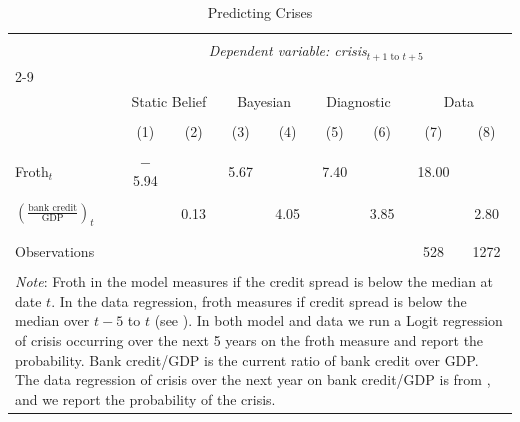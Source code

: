 
\begin{table}[!htbp] \centering 
  \caption{Predicting Crises} 
  \label{prediction of crises} 
\begin{tabular}{@{\extracolsep{10pt}}lcccccccc} 
\\[-1.8ex]\hline 
\hline \\[-1.8ex] 
 & \multicolumn{8}{c}{\textit{Dependent variable: crisis$_{t+1\text{ to }t+5}$}} \\ 
\cline{2-9} 
\\[-1.8ex]
 & \multicolumn{2}{c}{Static Belief} & \multicolumn{2}{c}{Bayesian} & \multicolumn{2}{c}{Diagnostic} & \multicolumn{2}{c}{Data} \\ 
\\[-1.8ex] & (1) & (2) & (3) & (4) & (5) & (6) & (7) & (8)\\ 
\hline \\[-1.8ex] 
 Froth$_t$ & $-$5.94 &  & 5.67 &  & 7.40 &  & 18.00 &  \\ 
  &  &  &  &  &  &  &  &  \\ 
  $(\frac{\text{bank credit}}{\text{GDP}})_t$ &  & 0.13 &  & 4.05 &  & 3.85 &  & 2.80 \\ 
  &  &  &  &  &  &  &  &  \\ 
 \hline \\[-1.8ex] 
Observations &  &  &  &  &  &  & 528 & 1272 \\ 
\hline 
\hline \\[-1.8ex] 
\multicolumn{9}{p{0.95\textwidth}}{\footnotesize \textit{Note}: 
  Froth in the model measures if the credit spread is below the median at date $t$.  In the data regression, froth measures if credit spread is below the median over $t-5$ to $t$ (see \cite{krishnamurthy2017credit}).  In both model and data we run a Logit regression of crisis occurring over the next 5 years on the froth measure and report the probability.  
  Bank credit/GDP is the current ratio of bank credit over GDP.  The data regression of crisis over the next year on bank credit/GDP is from \cite{schularick2012credit}, and we report the probability of the crisis.
}  
\end{tabular} 
\end{table} 
